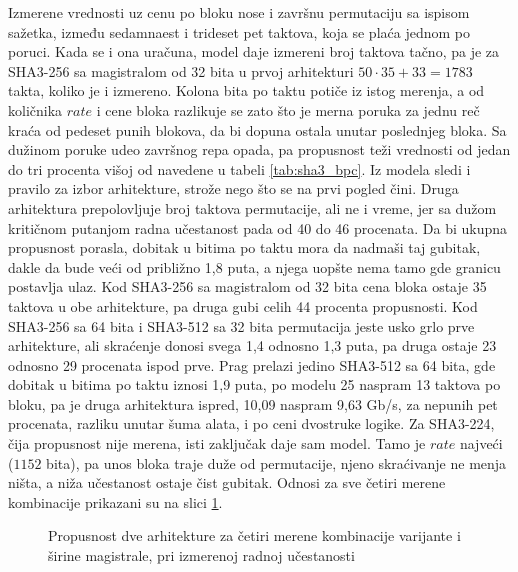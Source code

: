 Izmerene vrednosti uz cenu po bloku nose i završnu permutaciju sa ispisom sažetka, između sedamnaest i trideset pet taktova, koja se plaća jednom po poruci. Kada se i ona uračuna, model daje izmereni broj taktova tačno, pa je za SHA3-256 sa magistralom od 32 bita u prvoj arhitekturi $50 \cdot 35 + 33 = 1783$ takta, koliko je i izmereno. Kolona bita po taktu potiče iz istog merenja, a od količnika $rate$ i cene bloka razlikuje se zato što je merna poruka za jednu reč kraća od pedeset punih blokova, da bi dopuna ostala unutar poslednjeg bloka. Sa dužinom poruke udeo završnog repa opada, pa propusnost teži vrednosti od jedan do tri procenta višoj od navedene u tabeli \ref{tab:sha3_bpc}.
\smallbreak
Iz modela sledi i pravilo za izbor arhitekture, strože nego što se na prvi pogled čini. Druga arhitektura prepolovljuje broj taktova permutacije, ali ne i vreme, jer sa dužom kritičnom putanjom radna učestanost pada od 40 do 46 procenata. Da bi ukupna propusnost porasla, dobitak u bitima po taktu mora da nadmaši taj gubitak, dakle da bude veći od približno 1,8 puta, a njega uopšte nema tamo gde granicu postavlja ulaz. Kod SHA3-256 sa magistralom od 32 bita cena bloka ostaje 35 taktova u obe arhitekture, pa druga gubi celih 44 procenta propusnosti. Kod SHA3-256 sa 64 bita i SHA3-512 sa 32 bita permutacija jeste usko grlo prve arhitekture, ali skraćenje donosi svega 1,4 odnosno 1,3 puta, pa druga ostaje 23 odnosno 29 procenata ispod prve. Prag prelazi jedino SHA3-512 sa 64 bita, gde dobitak u bitima po taktu iznosi 1,9 puta, po modelu 25 naspram 13 taktova po bloku, pa je druga arhitektura ispred, 10,09 naspram 9,63 Gb/s, za nepunih pet procenata, razliku unutar šuma alata, i po ceni dvostruke logike. Za SHA3-224, čija propusnost nije merena, isti zaključak daje sam model. Tamo je $rate$ najveći ($1152$ bita), pa unos bloka traje duže od permutacije, njeno skraćivanje ne menja ništa, a niža učestanost ostaje čist gubitak. Odnosi za sve četiri merene kombinacije prikazani su na slici \ref{fig:sha3_gbps}.

\begin{figure}[H]
\centering
{}
\caption{Propusnost dve arhitekture za četiri merene kombinacije varijante i širine magistrale, pri izmerenoj radnoj učestanosti}
\label{fig:sha3_gbps}
\end{figure}

